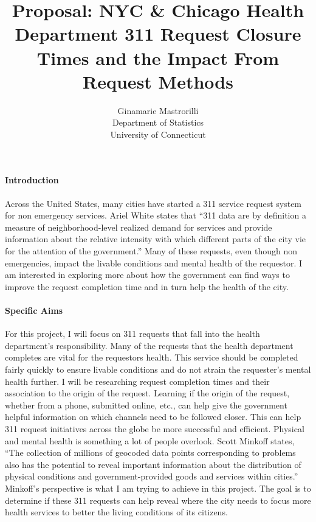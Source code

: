 \documentclass[12pt]{article}
\title{Proposal: NYC & Chicago Health Department 311 Request Closure Times and the Impact From Request Methods }
\author{Ginamarie Mastrorilli\\
  Department of Statistics\\
  University of Connecticut
}
\begin{document}
\maketitle


\paragraph{Introduction}
Across the United States, many cities have started a 311 service request system for non emergency services. 
Ariel White states that “311 data are by definition a measure of neighborhood-level realized demand for services and provide information about the relative intensity with which different parts of the city vie for the attention of the government.” 
Many of these requests, even though non emergencies, impact the livable conditions and mental health of the requestor. 
I am interested in exploring more about how the government can find ways to improve the request completion time and in turn help the health of the city. 


\paragraph{Specific Aims}
For this project, I will focus on 311 requests that fall into the health department’s responsibility.
Many of the requests that the health department completes are vital for the requestors health. This service should be completed fairly quickly to ensure livable conditions and do not strain the requester's mental health further. 
I will be researching request completion times and their association to the origin of the request. 
Learning if the origin of the request, whether from a phone, submitted online, etc., can help give the government helpful information on which channels need to be followed closer. 
This can help 311 request initiatives across the globe be more successful and efficient. 
Physical and mental health is something a lot of people overlook. 
Scott Minkoff states, “The collection of millions of geocoded data points corresponding to problems also has the potential to reveal important information about the distribution of physical conditions and government-provided goods and services within cities.” 
Minkoff’s perspective is what I am trying to achieve in this project. 
The goal is to determine if these 311 requests can help reveal where the city needs to focus more health services to better the living conditions of its citizens. 
\end{document}
